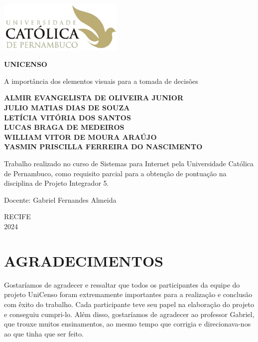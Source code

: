 \documentclass[a4paper,12pt]{article}
\begin{document}
\begin{titlepage}
  \centering
  \includegraphics[width=6cm]{logo.png} 
  
  \vspace*{2cm}

  \Huge
  \textbf{UNICENSO}

  \vspace{0.5cm}
  \LARGE
  A importância dos elementos visuais para a tomada de decisões

  \vspace{1.5cm}

  \small %
  \textbf{ALMIR EVANGELISTA DE OLIVEIRA JUNIOR}\\
  \textbf{JULIO MATIAS DIAS DE SOUZA}\\
  \textbf{LETÍCIA VITÓRIA DOS SANTOS}\\
  \textbf{LUCAS BRAGA DE MEDEIROS}\\
  \textbf{WILLIAM VITOR DE MOURA ARAÚJO}\\
  \textbf{YASMIN PRISCILLA FERREIRA DO NASCIMENTO}

  \vfill

  \Large
  Trabalho realizado no curso de Sistemas para Internet pela Universidade Católica de Pernambuco, como requisito parcial para a obtenção de pontuação na disciplina de Projeto Integrador 5.

  \vspace{0.8cm}
  \Large
  Docente: Gabriel Fernandes Almeida

  \vspace{0.8cm}
  \Large
  RECIFE\\
  2024
\end{titlepage}



\newpage

\section*{AGRADECIMENTOS}

Gostaríamos de agradecer e ressaltar que todos os participantes da equipe do projeto UniCenso foram extremamente importantes para a realização e conclusão com êxito do trabalho. Cada participante teve seu papel na elaboração do projeto e conseguiu cumpri-lo. Além disso, gostaríamos de agradecer ao professor Gabriel, que trouxe muitos ensinamentos, ao mesmo tempo que corrigia e direcionava-nos ao que tinha que ser feito.
\end{document}
